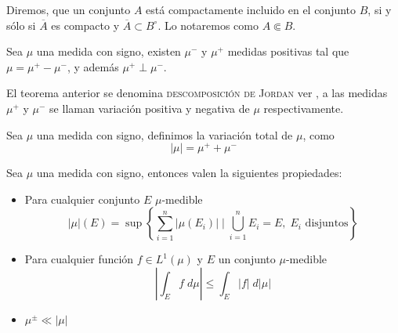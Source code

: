 \begin{defi}
	Diremos, que un conjunto $A$ está compactamente incluido  en el conjunto $B$, si y sólo si $\overline{A}$ es compacto y $\overline{A}\subset B^\circ$. Lo notaremos como $A\Subset B$.
	\index[Simbolo]{$\Subset$}
 \end{defi}
\begin{thm}
    Sea $\mu$ una medida con signo, existen $\mu^-$ y $\mu^+$ medidas positivas tal que $\mu=\mu^+-\mu^-$, y además $\mu^+\perp \mu^-$.\index[Simbolo]{$\mu^+$}\index[Simbolo]{$\mu^-$}
\end{thm}
El teorema anterior se denomina \textsc{descomposición de Jordan} ver \cite[Capitulo 3.1]{folland} , a las medidas $\mu^+$ y $\mu^-$ se llaman variación positiva y negativa de $\mu$ respectivamente.

\begin{defi}
    Sea $\mu$ una medida con signo, definimos la variación total de $\mu$, como 
    \begin{equation*}
        |\mu|=\mu^+ +\mu^-
    \end{equation*}\index[Simbolo]{$\vert\mu\vert$}
    
\end{defi}
\begin{obs}
 Sea $\mu$ una medida con signo, entonces valen la siguientes propiedades: \label{obs:medida}
 \begin{itemize}
     \item Para cualquier conjunto $E$ $\mu$-medible
 \begin{equation}
     |\mu|(E)=\sup\left\{\sum_{i=1}^n|\mu(E_i)| \mid \bigcup_{i=1}^nE_i=E, \; E_i \text{ disjuntos}  \right\}
 \end{equation}
 
 \item Para cualquier función $f\in L^1(\mu)$ y $E$ un conjunto $\mu$-medible
 $$\left|\int_Ef\;d\mu\right|\leq \int_E|f|\; d|\mu|$$
 \item $ \mu^{\pm}\ll |\mu|$
 \end{itemize}
\end{obs}

